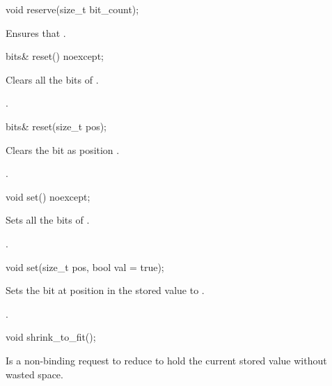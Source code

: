 \begin{addedblock}
\begin{itemdecl}
void reserve(size_t bit_count);
\end{itemdecl}

\begin{itemdescr}
\effects Ensures that .
\end{itemdescr}

\begin{itemdecl}
bits& reset() noexcept;
\end{itemdecl}

\begin{itemdescr}
\effects Clears all the bits of .

\returns {}.
\end{itemdescr}

\begin{itemdecl}
bits& reset(size_t pos);
\end{itemdecl}

\begin{itemdescr}
\effects Clears the bit as position .

\returns {}.
\end{itemdescr}

\begin{itemdecl}
void set() noexcept;
\end{itemdecl}

\begin{itemdescr}
\effects Sets all the bits of .

.
\end{itemdescr}

\begin{itemdecl}
void set(size_t pos, bool val = true);
\end{itemdecl}

\begin{itemdescr}
\effects Sets the bit at position  in the stored value to .

\returns {}.
\end{itemdescr}

\begin{itemdecl}
void shrink_to_fit();
\end{itemdecl}

\begin{itemdescr}
\effects Is a non-binding request to reduce  to hold the current stored value without wasted space.
\end{itemdescr}


\end{addedblock}

